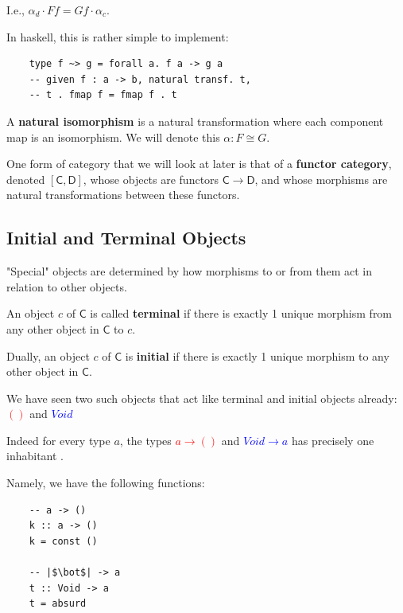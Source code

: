 \documentclass[tikz]{beamer}
\newcommand{\cat}[1]{\bm{ \mathsf{#1} }}
\newcommand{\cc}{\cat{C}}
\newcommand{\dd}{\cat{D}}
\newcommand{\mred}[1]{\textcolor{red}{$#1$}}
\newcommand{\mblue}[1]{\textcolor{blue}{$#1$}}
\theoremstyle{definition}
\begin{document}
\frame
{
	I.e., $\alpha_d \cdot Ff = Gf \cdot \alpha_c$.
}

\begin{frame}[fragile]

	In haskell, this is rather simple to implement: 
	
	\begin{verbatim}
	type f ~> g = forall a. f a -> g a
	-- given f : a -> b, natural transf. t,
	-- t . fmap f = fmap f . t 
	\end{verbatim}
\end{frame}

\frame
{
	A \textbf{natural isomorphism} is a natural transformation where each component map is an isomorphism. We will denote this $\alpha : F \cong G$. 
	
}

\frame
{
	One form of category that we will look at later is that of a \textbf{functor category}, denoted $[\cc, \dd]$, whose objects are functors $\cc \to \dd$, and whose morphisms are natural transformations between these functors. 
}

\subsection{Initial and Terminal Objects}

\frame
{
	"Special" objects are determined by how morphisms to or from them act in relation to other objects. 
}

\frame
{
	\begin{definition}
		An object $c$ of $\cc$ is called \textbf{terminal} if there is exactly 1 unique morphism from any other object in $\cc$ to $c$. 
		
		Dually,  an object $c$ of $\cc$ is \textbf{initial} if there is exactly 1 unique morphism to any other object in $\cc$. 
	\end{definition}
}

\frame
{
	We have seen two such objects that act like terminal and initial objects already: \mred{()} and \mblue{Void}
}

\frame
{
	Indeed for every type $a$, the types \mred{a \to ()} and \mblue{Void \to a} has precisely one inhabitant . 
}

\begin{frame}[fragile]

Namely, we have the following functions: 

	\begin{verbatim}
	-- a -> ()
	k :: a -> ()
	k = const ()
	
	-- |$\bot$| -> a
	t :: Void -> a
	t = absurd
	\end{verbatim}
\end{frame}
\end{document}
